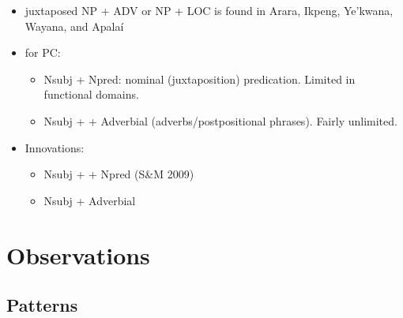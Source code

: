 \documentclass{memoir}
\begin{document}
\begin{itemize}
\tightlist
\item
  juxtaposed NP + ADV or NP + LOC is found in Arara, Ikpeng, Ye'kwana,
  Wayana, and Apalaí
\item
  for PC:

  \begin{itemize}
  \tightlist
  \item
    Nsubj + Npred: nominal (juxtaposition) predication. Limited in
    functional domains.
  \item
    Nsubj +  + Adverbial (adverbs/postpositional phrases).
    Fairly unlimited.
  \end{itemize}
\item
  Innovations:

  \begin{itemize}
  \tightlist
  \item
    Nsubj +  + Npred (S\&M 2009)
  \item
    Nsubj + Adverbial
  \end{itemize}
\end{itemize}

\section{Observations}

\subsection{Patterns}
\end{document}

